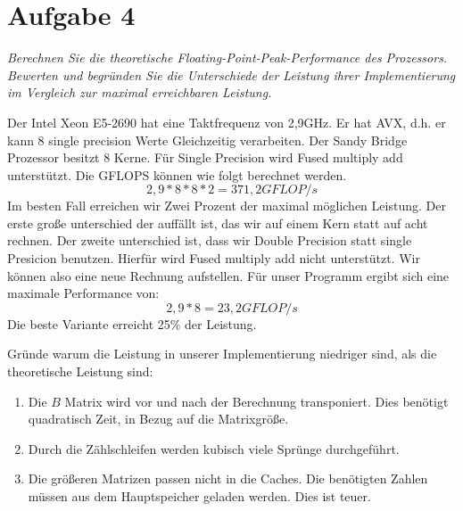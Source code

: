 \chapter{Aufgabe 4}
\textit{Berechnen Sie die theoretische Floating-Point-Peak-Performance des Prozessors. Bewerten und begründen Sie die Unterschiede der Leistung ihrer Implementierung im Vergleich zur maximal erreichbaren Leistung.}

Der Intel Xeon E5-2690 hat eine Taktfrequenz von 2,9GHz. Er hat AVX, d.h. er kann 8 single precision Werte Gleichzeitig verarbeiten. Der Sandy Bridge Prozessor besitzt 8 Kerne. Für Single Precision wird Fused multiply add unterstützt.
Die GFLOPS können wie folgt berechnet werden. 
\[2,9 * 8 * 8 * 2 = 371,2 GFLOP/s \]
Im besten Fall erreichen wir Zwei Prozent der maximal möglichen Leistung. Der erste große unterschied der auffällt ist, das wir auf einem Kern statt auf acht rechnen. Der zweite unterschied ist, dass wir Double Precision statt single Presicion benutzen. Hierfür wird Fused multiply add nicht unterstützt. Wir können also eine neue Rechnung aufstellen. Für unser Programm ergibt sich eine maximale Performance von:
\[2,9 * 8 = 23,2 GFLOP/s\]
Die beste Variante erreicht 25\% der Leistung. 

Gründe warum die Leistung in unserer Implementierung niedriger sind, als die theoretische Leistung sind:
\begin{enumerate}
 \item Die $B$ Matrix wird vor und nach der Berechnung transponiert. Dies benötigt quadratisch Zeit, in Bezug auf die Matrixgröße.
 \item Durch die Zählschleifen werden kubisch viele Sprünge durchgeführt.  
 \item Die größeren Matrizen passen nicht in die Caches. Die benötigten Zahlen müssen aus dem Hauptspeicher geladen werden. Dies ist teuer. 
\end{enumerate}

